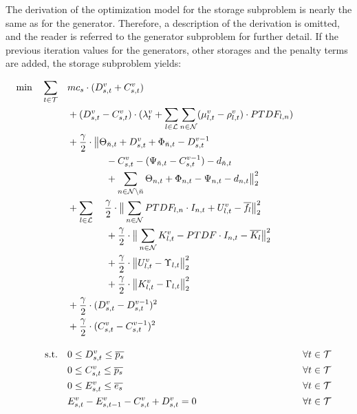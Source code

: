 The derivation of the optimization model for the storage subproblem is nearly the same as for the generator. Therefore, a description of the derivation is omitted, and the reader is referred to the generator subproblem for further detail. If the previous iteration values for the generators, other storages and the penalty terms are added, the storage subproblem yields:

 \begin{subequations}
	\begin{align}
		 \min \quad \sum_{t\in\mathcal{T}} \quad & mc_s \cdot (D_{s,t}^v + C_{s,t}^v)\label{eq:sub:stor}\\
		 & + (D_{s,t}^v - C_{s,t}^v) \cdot (\lambda_t^v + \sum_{l \in \mathcal{L}} \sum_{n \in \mathcal{N}} (\mu_{l,t}^v - \rho_{l,t}^v) \cdot PTDF_{l,n}) \nonumber \\ 
		 & + \frac{\gamma}{2} \cdot \big\| \Theta_{\breve{n},t} + D_{s,t}^v + \Phi_{\breve{n},t} - D_{s,t}^{v-1} \nonumber \\
		 & \qquad \qquad - C_{s,t}^v - (\Psi_{\breve{n},t} - C_{s,t}^{v-1}) - d_{\breve{n},t} \nonumber \\
		 & \qquad \qquad + \sum_{n \in \mathcal{N} \setminus \breve{n}} \Theta_{n,t} + \Phi_{n,t} - \Psi_{n,t} - d_{n,t} \big\|^2_2 \nonumber \\
		 & + \sum_{l \in \mathcal{L}} \quad \frac{\gamma}{2} \cdot \big\| \sum_{n \in \mathcal{N}} PTDF_{l,n} \cdot I_{n,t} + U_{l,t}^v - \overline{f_l}\big\|^2_2 \nonumber \\
		 & \qquad \qquad + \frac{\gamma}{2} \cdot \big\| \sum_{n \in \mathcal{N}} K_{l,t}^v - PTDF \cdot I_{n,t} - \overline{K_l}\big\|^2_2\nonumber \\
		 & \qquad \qquad + \frac{\gamma}{2} \cdot \big\|U_{l,t}^v - \Upsilon_{l,t}  \big\|^2_2 \nonumber\\
		 & \qquad \qquad + \frac{\gamma}{2} \cdot \big\|K_{l,t}^v - \Gamma_{l,t}  \big\|^2_2 \nonumber \\
		 & + \frac{\gamma}{2} \cdot (D_{s,t}^v - D_{s,t}^{v-1} )^2 \nonumber \\
		 & + \frac{\gamma}{2} \cdot (C_{s,t}^v - C_{s,t}^{v-1} )^2 \nonumber \\[10pt]
		 \text{s.t.} \quad & 0 \leq D_{s,t}^v \leq \overline{p_s} && \forall t \in \mathcal{T} \\
		 & 0 \leq C_{s,t}^v \leq \overline{p_s} && \forall t \in \mathcal{T}\\
		 & 0 \leq E_{s,t}^v \leq \overline{e_s} && \forall t \in \mathcal{T}\\
		 & E_{s,t}^v - E_{s,t-1}^v - C_{s,t}^v + D_{s,t}^v = 0 && \forall t \in \mathcal{T}
	\end{align}
\end{subequations}

